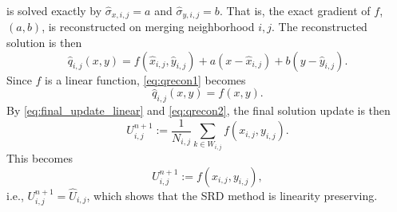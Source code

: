 is solved exactly by $\widehat{\sigma}_{x,i,j}=a$ and $\widehat{\sigma}_{y,i,j}=b$.  That is, the exact gradient of $f$, $(a,b)$, is reconstructed on merging neighborhood $i,j$.  The reconstructed solution is then
\begin{equation}
    \label{eq:qrecon1}
    \hat{q}_{i,j}(x,y) = f(\widehat{x}_{i,j},\widehat{y}_{i,j}) + a(x-\widehat{x}_{i,j})+b(y-\widehat{y}_{i,j}) .
\end{equation}
Since $f$ is a linear function, \eqref{eq:qrecon1} becomes
\begin{equation}
    \label{eq:qrecon2}
    \hat{q}_{i,j}(x,y) = f(x,y).
\end{equation}
By \eqref{eq:final_update_linear} and \eqref{eq:qrecon2}, the final solution update is then
\begin{equation} 
U^{n+1}_{i,j} := \frac{1}{N_{i,j}}\sum_{k \in W_{i,j}}f(x_{i,j},y_{i,j}).
\end{equation}
This becomes
\begin{equation} 
U^{n+1}_{i,j} := f(x_{i,j},y_{i,j}),
\end{equation}
i.e., $U^{n+1}_{i,j} = \widehat{U}_{i,j}$, which shows that the SRD method is linearity preserving.



